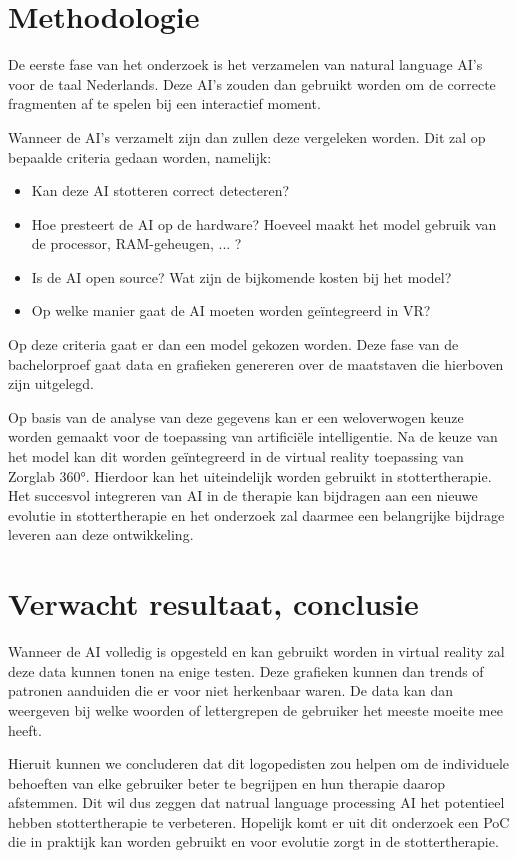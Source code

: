 \section{Methodologie}%
\label{sec:methodologie}
De eerste fase van het onderzoek is het verzamelen van natural language AI's voor de taal Nederlands. Deze AI's zouden dan gebruikt worden om de correcte fragmenten af te spelen bij een interactief moment.\par
Wanneer de AI's verzamelt zijn dan zullen deze vergeleken worden. Dit zal op bepaalde criteria gedaan worden, namelijk:
\begin{itemize}
    \item Kan deze AI stotteren correct detecteren?
    \item Hoe presteert de AI op de hardware? Hoeveel maakt het model gebruik van de processor, RAM-geheugen, ... ?
    \item Is de AI open source? Wat zijn de bijkomende kosten bij het model?
    \item Op welke manier gaat de AI moeten worden geïntegreerd in VR?
\end{itemize}
Op deze criteria gaat er dan een model gekozen worden. Deze fase van de bachelorproef gaat data en grafieken genereren over de maatstaven die hierboven zijn uitgelegd.\par
Op basis van de analyse van deze gegevens kan er een weloverwogen keuze worden gemaakt voor de toepassing van artificiële intelligentie. Na de keuze van het model kan dit worden geïntegreerd in de virtual reality toepassing van Zorglab 360°. Hierdoor kan het uiteindelijk worden gebruikt in stottertherapie. Het succesvol integreren van AI in de therapie kan bijdragen aan een nieuwe evolutie in stottertherapie en het onderzoek zal daarmee een belangrijke bijdrage leveren aan deze ontwikkeling.
\section{Verwacht resultaat, conclusie}%
\label{sec:verwachte_resultaten}
Wanneer de AI volledig is opgesteld en kan gebruikt worden in virtual reality zal deze data kunnen tonen na enige testen. Deze grafieken kunnen dan trends of patronen aanduiden die er voor niet herkenbaar waren. De data kan dan weergeven bij welke woorden of lettergrepen de gebruiker het meeste moeite mee heeft.\par
Hieruit kunnen we concluderen dat dit logopedisten zou helpen om de individuele behoeften van elke gebruiker beter te begrijpen en hun therapie daarop afstemmen. Dit wil dus zeggen dat natrual language processing AI het potentieel hebben stottertherapie te verbeteren. Hopelijk komt er uit dit onderzoek een PoC die in praktijk kan worden gebruikt en voor evolutie zorgt in de stottertherapie.


